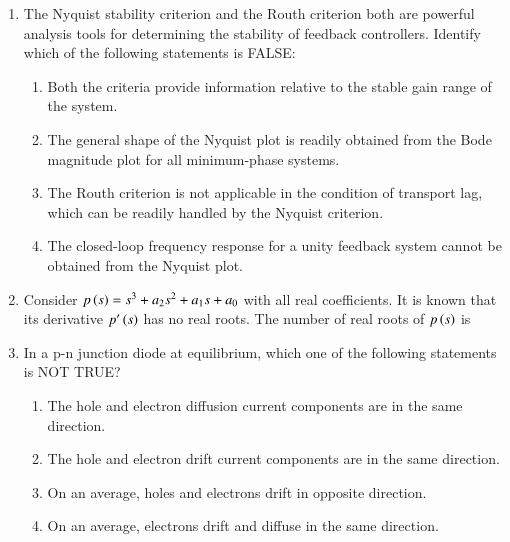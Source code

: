 \documentclass[a4paper, 11pt]{article}
\begin{document}
\begin{enumerate}
    \hfill{}

    \item The Nyquist stability criterion and the Routh criterion both are powerful analysis tools for determining the stability of feedback controllers. Identify which of the following statements is FALSE:
    \begin{enumerate}
        \item Both the criteria provide information relative to the stable gain range of the system.
        \item The general shape of the Nyquist plot is readily obtained from the Bode magnitude plot for all minimum-phase systems.
        \item The Routh criterion is not applicable in the condition of transport lag, which can be readily handled by the Nyquist criterion.
        \item The closed-loop frequency response for a unity feedback system cannot be obtained from the Nyquist plot.
    \end{enumerate}

    \hfill{}

    \item Consider $p\left(s\right) = s^3 + a_2s^2 + a_1s + a_0$ with all real coefficients. It is known that its derivative $p'\left(s\right)$ has no real roots. The number of real roots of $p\left(s\right)$ is
    \begin{enumerate}
    \end{enumerate}

    \hfill{}

    \item In a p-n junction diode at equilibrium, which one of the following statements is NOT TRUE?
    \begin{enumerate}
        \item The hole and electron diffusion current components are in the same direction.
        \item The hole and electron drift current components are in the same direction.
        \item On an average, holes and electrons drift in opposite direction.
        \item On an average, electrons drift and diffuse in the same direction.
    \end{enumerate}


\end{enumerate}
\end{document}
